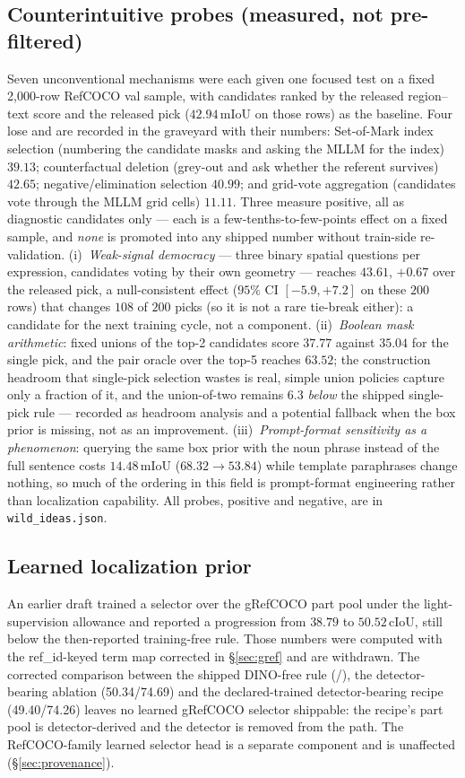\subsection{Counterintuitive probes (measured, not pre-filtered)}
\label{sec:wild}
Seven unconventional mechanisms were each given one focused test on a fixed
2{,}000-row RefCOCO val sample, with candidates ranked by the released
region--text score and the released pick ($42.94$\,mIoU on those rows) as the
baseline. Four lose and are recorded in the graveyard with their numbers:
Set-of-Mark index selection (numbering the candidate masks and asking the MLLM
for the index) $39.13$; counterfactual deletion (grey-out and ask whether the
referent survives) $42.65$; negative/elimination selection $40.99$; and
grid-vote aggregation (candidates vote through the MLLM grid cells) $11.11$.
Three measure positive, all as diagnostic candidates only --- each is a
few-tenths-to-few-points effect on a fixed sample, and \emph{none} is promoted
into any shipped number without train-side re-validation. (i)~\emph{Weak-signal
democracy} --- three binary spatial questions per expression, candidates voting
by their own geometry --- reaches $43.61$, $+0.67$ over the released pick, a
null-consistent effect ($95\%$ CI $[-5.9,+7.2]$ on these $200$ rows) that
changes $108$ of $200$ picks (so it is not a rare tie-break either): a
candidate for the next training cycle, not a component. (ii)~\emph{Boolean mask
arithmetic}: fixed unions of the top-2 candidates score $37.77$ against
$35.04$ for the single pick, and the pair oracle over the top-5 reaches
$63.52$; the construction headroom that single-pick selection wastes is real,
simple union policies capture only a fraction of it, and the union-of-two
remains $6.3$ \emph{below} the shipped single-pick rule --- recorded as
headroom analysis and a potential fallback when the box prior is missing, not
as an improvement. (iii)~\emph{Prompt-format
sensitivity as a phenomenon}: querying the same box prior with the noun phrase
instead of the full sentence costs $14.48$\,mIoU ($68.32 \to 53.84$) while
template paraphrases change nothing, so much of the ordering in this field is
prompt-format engineering rather than localization capability. All probes,
positive and negative, are in \texttt{wild\_ideas.json}.

\subsection{Learned localization prior}
\label{sec:learned}
An earlier draft trained a selector over the gRefCOCO part pool under the
light-supervision allowance and reported a progression from $38.79$ to
$50.52$\,cIoU, still below the then-reported training-free rule. Those numbers
were computed with the ref\_id-keyed term map corrected in
\S\ref{sec:gref} and are withdrawn. The corrected comparison between the shipped DINO-free rule
(\grefCIoU{}/\grefGIoU), the detector-bearing ablation (50.34/74.69) and the
declared-trained detector-bearing recipe (49.40/74.26) leaves no learned
gRefCOCO selector shippable: the recipe's part pool is detector-derived and
the detector is removed from the path. The RefCOCO-family learned selector head is a separate
component and is unaffected (\S\ref{sec:provenance}).

